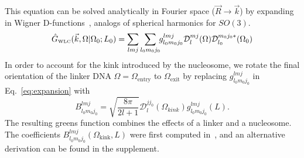 \documentclass[%
 reprint,
superscriptaddress,
showpacs,preprintnumbers,
 amsmath,amssymb,
 aps,
 prl,
]{revtex4-1}
\newcommand{\ghat}[2][\Omega_0; L_0]{\hat{G}_\text{\tiny WLC}(#2|#1)}
\newcommand{\wigD}{\mathcal{D}}
\begin{document}
This equation can be solved analytically in Fourier space
    ($\vec{R} \rightarrow \vec{k}$) by expanding in Wigner
    D-functions~\cite{spakowitz2006}, analogs of spherical harmonics for
    $SO(3)$.
\begin{equation}\label{eq:expansion}
    \ghat{\vec{k}, \Omega} = \sum_{l m j}\sum_{l_0 m_0 j_0} \!\! g_{l_0 m_0 j_0}^{lmj}
        \wigD_l^{mj}(\Omega)\wigD_{l_0}^{m_0 j_0 *}(\Omega_0)
\end{equation}
In order to account for the kink introduced by the nucleosome, we rotate
    the final orientation of the linker DNA ${\Omega = \Omega_\text{entry}}$ to
    $\Omega_\text{exit}$ by replacing
    $g_{l_0 m_0 j_0}^{lmj}$ in Eq.~\ref{eq:expansion} with
    \begin{equation}\label{eq:coeffs}
        B_{l_{0}m_{0}j_{0}}^{lmj} = %
        \sqrt{\frac{8\pi}{2l+1}}
        \mathcal{D}_{l}^{jj_{0}}
        \left(\Omega_{kink}\right)g_{l_{0}m_{0}j_{0}}^{lmj}\left(L\right).
    \end{equation}
    The resulting greens function combines the effects of a linker and a
    nucleosome.
The coefficients $B_{l_0 m_0 j_0}^{lmj}(\Omega_\text{kink}, L)$ were first
    computed in~\cite{zhou2003}, and an alternative derivation can be found in
    the supplement.
\end{document}
